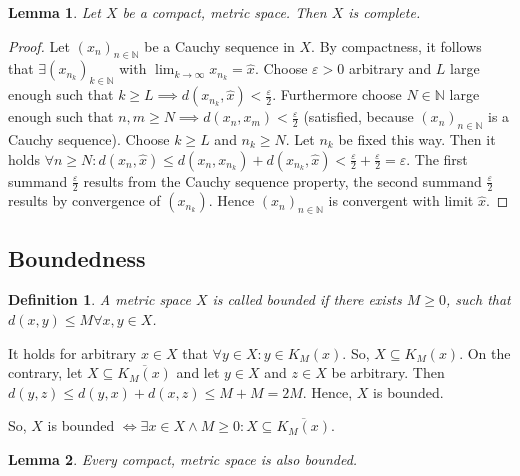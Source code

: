 \documentclass{article}
\newtheorem{definition}{Definition}  \numberwithin{definition}{section}
\newtheorem{lemma}{Lemma}  \numberwithin{lemma}{section}
\begin{document}
\begin{lemma} %
  Let $X$ be a compact, metric space. Then $X$ is complete.
\end{lemma}
\begin{proof}
  Let $(x_n)_{n\in\mathbb N}$ be a Cauchy sequence in $X$. By compactness, it follows that
  $\exists (x_{n_k})_{k \in \mathbb N}$ with $\lim_{k\to\infty} x_{n_k} = \hat{x}$.
  Choose $\varepsilon > 0$ arbitrary and $L$ large enough such that $k \geq L \implies d(x_{n_k}, \hat{x}) < \frac\varepsilon2$. Furthermore choose $N \in \mathbb N$ large enough such that $n,m \geq N \implies d(x_n, x_m) < \frac\varepsilon2$ (satisfied, because $(x_n)_{n \in \mathbb N}$ is a Cauchy sequence).
  Choose $k \geq L$ and $n_k \geq N$. Let $n_k$ be fixed this way.
  Then it holds $\forall n \geq N: d(x_n, \hat{x}) \leq d(x_n, x_{n_k}) + d(x_{n_k}, \hat{x}) < \frac\varepsilon2 + \frac\varepsilon2 = \varepsilon$. The first summand $\frac\varepsilon2$ results from the Cauchy sequence property, the second summand $\frac\varepsilon2$ results by convergence of $(x_{n_k})$. Hence $(x_n)_{n\in\mathbb N}$ is convergent with limit $\hat{x}$.
\end{proof}

\subsection{Boundedness}
\begin{definition} %
  A metric space $X$ is called \emph{bounded} if there exists $M \geq 0$, such that $d(x,y) \leq M \forall x,y \in X$.
\end{definition}
It holds for arbitrary $x \in X$ that $\forall y \in X: y \in K_M(x)$.
So, $X \subseteq K_M(x)$.
On the contrary, let $X \subseteq \overline{K_M(x)}$ and let $y \in X$ and $z \in X$ be arbitrary. Then $d(y, z) \leq d(y, x) + d(x, z) \leq M + M = 2M$. Hence, $X$ is bounded.

So, $X$ is bounded $\iff \exists x \in X \land M \geq 0: X \subseteq \overline{K_M(x)}$.

\begin{lemma} %
  Every compact, metric space is also bounded.
\end{lemma}
\end{document}
